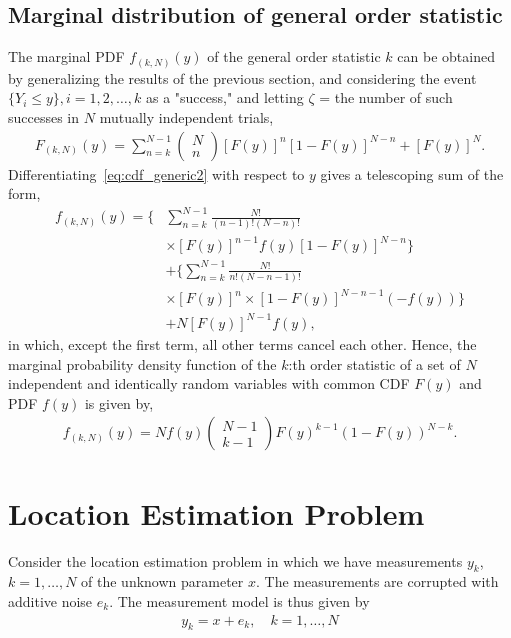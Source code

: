 \documentclass[journal]{IEEEtran}
\begin{document}
\subsection{Marginal distribution of general order statistic}\label{subsec:marginal_distribution_of_general_order_statistic}
The marginal PDF $f_{(k,N)}(y)$ of the general order statistic $k$ can be obtained by generalizing the results of the previous section, and considering the event $\{Y_i \leq y\}, i = 1, 2, \ldots, k$ as a "success," and letting $\zeta$ = the number of such successes in $N$ mutually independent trials,
%
%
\begin{align}
F_{(k,N)}(y)=\sum_{n=k}^{N-1}\begin{pmatrix}N\\n\end{pmatrix}[F(y)]^n[1-F(y)]^{N-n}+[F(y)]^N.
\label{eq:cdf_generic2}
\end{align}
%
%
Differentiating~\eqref{eq:cdf_generic2} with respect to $y$ gives a telescoping sum of the form,
%
%
\begin{equation}
\begin{aligned}
f_{(k,N)}(y)= {} \lbrace&\sum_{n=k}^{N-1}\frac{N!}{(n-1)!(N-n)!}\\&\times[F(y)]^{n-1}f(y)[1-F(y)]^{N-n}\rbrace\\ &+\{ \sum_{n=k}^{N-1}\frac{N!}{n!(N-n-1)!}\\&\times[F(y)]^n\times[1-F(y)]^{N-n-1}(-f(y))\}\\&+ N[F(y)]^{N-1}f(y),
\end{aligned}
\end{equation}
%
%
in which, except the first term, all other terms cancel each other. Hence, the marginal probability density function of the $k$:th order statistic of a set of $N$ independent and identically random variables with common CDF $F(y)$ and PDF $f(y)$ is given by,
%
%
\begin{align}
f_{(k,N)}(y) = Nf(y)\begin{pmatrix}N-1\\k-1\end{pmatrix}F(y)^{k-1}\left(1-F(y)\right)^{N-k}.
\label{eq:density_order}
\end{align}
\section{Location Estimation Problem}\label{sec:location_estimation_problem}
Consider the location estimation problem in which we have measurements $y_k$, $k=1,\ldots,N$ of the unknown parameter $x$. The measurements are corrupted with additive noise $e_k$. The measurement model is thus given by
%
%
\begin{align}
y_k=x+e_k, \quad k=1,\ldots,N
\label{eq:original_model}
\end{align}
%
%
\end{document}
